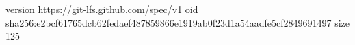 version https://git-lfs.github.com/spec/v1
oid sha256:e2bcf61765dcb62fedaef487859866e1919ab0f23d1a54aadfe5cf2849691497
size 125
